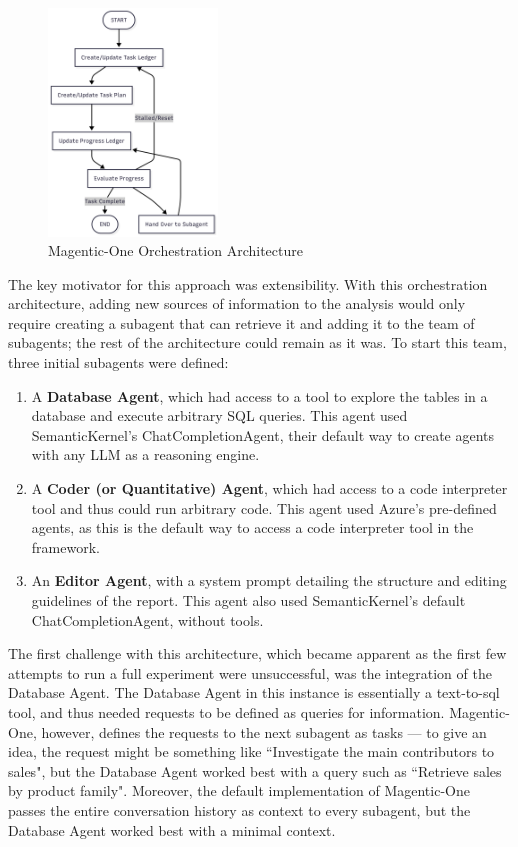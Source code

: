 \documentclass[a4paper]{report}
\begin{document}
\begin{figure}[h]
\centering
\includegraphics[width=0.4\textwidth]{images/mangentic-one-simplified.png}
\caption{Magentic-One Orchestration Architecture}
\label{fig:magentic-one-architecture}
\end{figure}

The key motivator for this approach was extensibility. With this orchestration architecture, adding new sources of information to the analysis would only require creating a subagent that can retrieve it and adding it to the team of subagents; the rest of the architecture could remain as it was. To start this team, three initial subagents were defined:

\begin{enumerate}
    \item A \textbf{Database Agent}, which had access to a tool to explore the tables in a database and execute arbitrary SQL queries. This agent used SemanticKernel's ChatCompletionAgent, their default way to create agents with any LLM as a reasoning engine.
    \item A \textbf{Coder (or Quantitative) Agent}, which had access to a code interpreter tool and thus could run arbitrary code. This agent used Azure's pre-defined agents, as this is the default way to access a code interpreter tool in the framework.
    \item An \textbf{Editor Agent}, with a system prompt detailing the structure and editing guidelines of the report. This agent also used SemanticKernel's default ChatCompletionAgent, without tools.
\end{enumerate}

The first challenge with this architecture, which became apparent as the first few attempts to run a full experiment were unsuccessful, was the integration of the Database Agent. The Database Agent in this instance is essentially a text-to-sql tool, and thus needed requests to be defined as queries for information. Magentic-One, however, defines the requests to the next subagent as tasks --- to give an idea, the request might be something like ``Investigate the main contributors to sales", but the Database Agent worked best with a query such as ``Retrieve sales by product family". Moreover, the default implementation of Magentic-One passes the entire conversation history as context to every subagent, but the Database Agent worked best with a minimal context.
\end{document}
